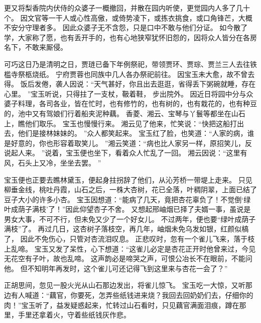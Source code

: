 更又将梨香院内伏侍的众婆子一概撤回，并散在园内听使，更觉园内人多了几十个。
因文官等一干人或心性高傲，或倚势凌下，或拣衣挑食，或口角锋芒，大概不安分守理者多。
因此众婆子无不含怨，只是口中不敢与他们分证。
如今散了学，大家称了愿，也有丢开手的，也有心地狭窄犹怀旧怨的，因将众人皆分在各房名下，不敢来厮侵。
\par
可巧这日乃是清明之日，贾琏已备下年例祭祀，带领贾环、贾琮、贾兰三人去往铁槛寺祭柩烧纸。
宁府贾蓉也同族中几人各办祭祀前往。
因宝玉未大愈，故不曾去得。
饭后发倦，袭人因说：“天气甚好，你且出去逛逛，省得丢下粥碗就睡，存在心里。
”宝玉听说，只得拄了一支杖，靸着鞋，
步出院外。
因近日将园中分与众婆子料理，各司各业，皆在忙时，也有修竹的，也有\wu 树的，也有栽花的，也有种豆的，池中又有驾娘们行着船夹泥种藕。
香菱、湘云、宝琴与丫鬟等都坐在山石上，瞧他们取乐。
宝玉也慢慢行来。
湘云见了他来，忙笑说：“快把这船打出去，他们是接林妹妹的。
”众人都笑起来。
宝玉红了脸，也笑道：“人家的病，谁是好意的，你也形容着取笑儿。
”湘云笑道：“病也比人家另一样，原招笑儿，反说起人来。
”说着，宝玉便也坐下，看着众人忙乱了一回。
湘云因说：“这里有风，石头上又冷，坐坐去罢。
”\par
宝玉便也正要去瞧林黛玉，便起身拄拐辞了他们，从沁芳桥一带堤上走来。
只见柳垂金线，桃吐丹霞，山石之后，一株大杏树，花已全落，叶稠阴翠，上面已结了豆子大小的许多小杏。
宝玉因想道：“能病了几天，竟把杏花辜负了！不觉倒‘绿叶成荫子满枝’了！”因此仰望杏子不舍。
又想起邢岫烟已择了夫婿一事，虽说是男女大事，不可不行，但未免又少了一个好女儿。
不过两年，便也要“绿叶成荫子满枝”了。
再过几日，这杏树子落枝空，再几年，岫烟未免乌发如银，红颜似槁了，
因此不免伤心，只管对杏流泪叹息。
正悲叹时，忽有一个雀儿飞来，落于枝上乱啼。
宝玉又发了呆性，心下想道：“这雀儿必定是杏花正开时他曾来过，今见无花空有子叶，故也乱啼。
这声韵必是啼哭之声，可恨公冶长不在眼前，不能问他。
但不知明年再发时，这个雀儿可还记得飞到这里来与杏花一会了？”\par
正胡思间，忽见一股火光从山石那边发出，将雀儿惊飞。
宝玉吃一大惊，又听那边有人喊道：“藕官，你要死，怎弄些纸钱进来烧？我回去回奶奶们去，仔细你的肉！”宝玉听了，益发疑惑起来，忙转过山石看时，只见藕官满面泪痕，蹲在那里，手里还拿着火，守着些纸钱灰作悲。
